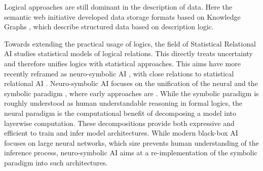 Logical approaches are still dominant in the description of data.
Here the semantic web initiative developed data storage formats based on Knowledge Graphs \cite{antoniou_semantic_2012,hogan_knowledge_2021}, which describe structured data based on description logic.

Towards extending the practical usage of logics, the field of Statistical Relational AI \cite{nickel_review_2016,getoor_introduction_2019} studies statistical models of logical relations.
This directly treats uncertainty and therefore unifies logics with statistical approaches.
This aims have more recently reframed as neuro-symbolic AI \cite{hochreiter_toward_2022, sarker_neuro-symbolic_2022}, with close relations to statistical relational AI \cite{marra_statistical_2024}.
Neuro-symbolic AI focuses on the unification of the neural and the symbolic paradigm \cite{garcez_neural-symbolic_2019}, where early approaches are \cite{towell_knowledge-based_1994,avila_garcez_connectionist_1999}.
While the symbolic paradigm is roughly understood as human understandable reasoning in formal logics, the neural paradigm is the computational benefit of decomposing a model into layerwise computation.
These decompositions provide both expressive and efficient to train and infer model architectures.
While modern black-box AI focuses on large neural networks, which size prevents human understanding of the inference process, neuro-symbolic AI aims at a re-implementation of the symbolic paradigm into such architectures.


